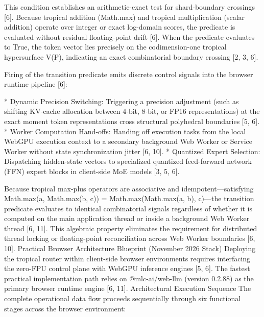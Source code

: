 This condition establishes an arithmetic-exact test for shard-boundary crossings [6]. Because tropical addition (Math.max) and tropical multiplication (scalar addition) operate over integer or exact log-domain scores, the predicate is evaluated without residual floating-point drift [6]. When the predicate evaluates to True, the token vector lies precisely on the codimension-one tropical hypersurface V(P), indicating an exact combinatorial boundary crossing [2, 3, 6].


Firing of the transition predicate emits discrete control signals into the browser runtime pipeline [6]:


* Dynamic Precision Switching: Triggering a precision adjustment (such as shifting KV-cache allocation between 4-bit, 8-bit, or FP16 representations) at the exact moment token representations cross structural polyhedral boundaries [5, 6].
* Worker Computation Hand-offs: Handing off execution tasks from the local WebGPU execution context to a secondary background Web Worker or Service Worker without state synchronization jitter [6, 10].
* Quantized Expert Selection: Dispatching hidden-state vectors to specialized quantized feed-forward network (FFN) expert blocks in client-side MoE models [3, 5, 6].


Because tropical max-plus operators are associative and idempotent—satisfying Math.max(a, Math.max(b, c)) = Math.max(Math.max(a, b), c)—the transition predicate evaluates to identical combinatorial signals regardless of whether it is computed on the main application thread or inside a background Web Worker thread [6, 11]. This algebraic property eliminates the requirement for distributed thread locking or floating-point reconciliation across Web Worker boundaries [6, 10].
Practical Browser Architecture Blueprint (November 2026 Stack)
Deploying the tropical router within client-side browser environments requires interfacing the zero-FPU control plane with WebGPU inference engines [5, 6]. The fastest practical implementation path relies on @mlc-ai/web-llm (version 0.2.88) as the primary browser runtime engine [6, 11].
Architectural Execution Sequence
The complete operational data flow proceeds sequentially through six functional stages across the browser environment:


